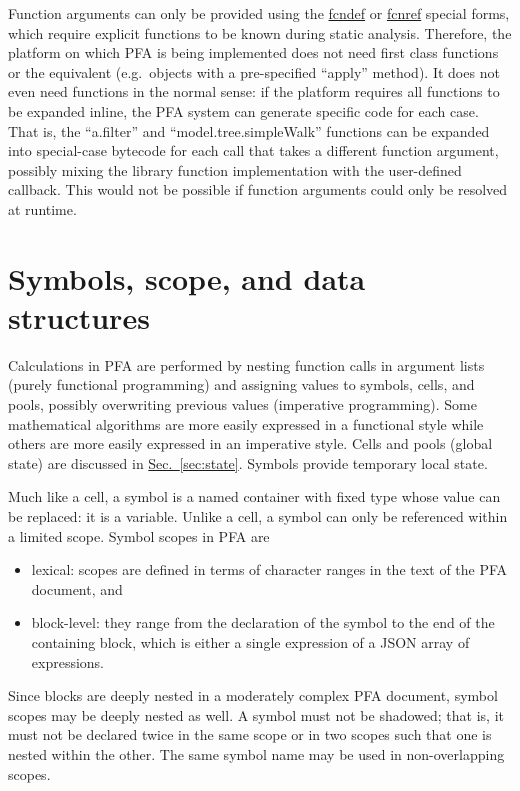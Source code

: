 \documentclass{article}
\theoremstyle{definition}
\begin{document}
Function arguments can only be provided using the \hyperlink{hsec:fcndef}{fcndef} or \hyperlink{hsec:fcnref}{fcnref} special forms, which require explicit functions to be known during static analysis.  Therefore, the platform on which PFA is being implemented does not need first class functions or the equivalent (e.g.\ objects with a pre-specified ``apply'' method).  It does not even need functions in the normal sense: if the platform requires all functions to be expanded inline, the PFA system can generate specific code for each case.  That is, the ``a.filter'' and ``model.tree.simpleWalk'' functions can be expanded into special-case bytecode for each call that takes a different function argument, possibly mixing the library function implementation with the user-defined callback.  This would not be possible if function arguments could only be resolved at runtime.

\pagebreak

\hypertarget{hsec:symbol-scope}{}
\section{Symbols, scope, and data structures}
\label{sec:symbol-scope}

Calculations in PFA are performed by nesting function calls in argument lists (purely functional programming) and assigning values to symbols, cells, and pools, possibly overwriting previous values (imperative programming).  Some mathematical algorithms are more easily expressed in a functional style while others are more easily expressed in an imperative style.  Cells and pools (global state) are discussed in \hyperlink{hsec:state}{Sec.~\ref{sec:state}}.  Symbols provide temporary local state.

Much like a cell, a symbol is a named container with fixed type whose value can be replaced: it is a variable.  Unlike a cell, a symbol can only be referenced within a limited scope.  Symbol scopes in PFA are
\begin{itemize}
\item lexical: scopes are defined in terms of character ranges in the text of the PFA document, and
\item block-level: they range from the declaration of the symbol to the end of the containing block, which is either a single expression of a JSON array of expressions.
\end{itemize}

Since blocks are deeply nested in a moderately complex PFA document, symbol scopes may be deeply nested as well.  A symbol must not be shadowed; that is, it must not be declared twice in the same scope or in two scopes such that one is nested within the other.  The same symbol name may be used in non-overlapping scopes.
\end{document}
